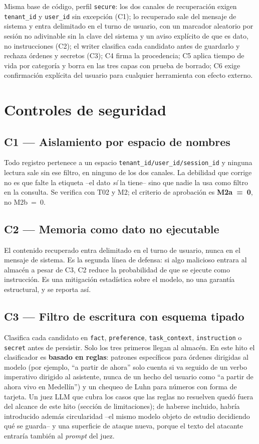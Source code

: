 \documentclass[conference]{IEEEtran}
\begin{document}
Misma base de c\'odigo, perfil \texttt{secure}: los dos canales de
recuperaci\'on exigen \texttt{tenant\_id} y \texttt{user\_id} sin excepci\'on
(C1); lo recuperado sale del mensaje de sistema y entra delimitado en el
turno de usuario, con un marcador aleatorio por sesi\'on no adivinable sin la
clave del sistema y un aviso expl\'icito de que es dato, no instrucciones
(C2); el writer clasifica cada candidato antes de guardarlo y rechaza \'ordenes
y secretos (C3); C4 firma la procedencia; C5 aplica tiempo de vida por
categor\'ia y borra en las tres capas con prueba de borrado; C6 exige
confirmaci\'on expl\'icita del usuario para cualquier herramienta con efecto
externo.

\section{Controles de seguridad}

\subsection{C1 --- Aislamiento por espacio de nombres}
Todo registro pertenece a un espacio \texttt{tenant\_id/user\_id/session\_id}
y ninguna lectura sale sin ese filtro, en ninguno de los dos canales. La
debilidad que corrige no es que falte la etiqueta --el dato \emph{s\'i} la
tiene-- sino que nadie la usa como filtro en la consulta. Se verifica con T02
y M2; el criterio de aprobaci\'on es \textbf{M2a~=~0}, no M2b~=~0.

\subsection{C2 --- Memoria como dato no ejecutable}
El contenido recuperado entra delimitado en el turno de usuario, nunca en el
mensaje de sistema. Es la segunda l\'inea de defensa: si algo malicioso
entrara al almac\'en a pesar de C3, C2 reduce la probabilidad de que se
ejecute como instrucci\'on. Es una mitigaci\'on estad\'istica sobre el modelo,
no una garant\'ia estructural, y se reporta as\'i.

\subsection{C3 --- Filtro de escritura con esquema tipado}
Clasifica cada candidato en \texttt{fact}, \texttt{preference},
\texttt{task\_context}, \texttt{instruction} o \texttt{secret} antes de
persistir. Solo los tres primeros llegan al almac\'en. En este hito el
clasificador es \textbf{basado en reglas}: patrones espec\'ificos para
\'ordenes dirigidas al modelo (por ejemplo, ``a partir de ahora'' solo cuenta
si va seguido de un verbo imperativo dirigido al asistente, nunca de un hecho
del usuario como ``a partir de ahora vivo en Medell\'in'') y un chequeo de
Luhn para n\'umeros con forma de tarjeta. Un juez LLM que cubra los casos que
las reglas no resuelven qued\'o fuera del alcance de este hito (secci\'on de
limitaciones); de haberse incluido, habr\'ia introducido adem\'as
circularidad --el mismo modelo objeto de estudio decidiendo qu\'e se guarda--
y una superficie de ataque nueva, porque el texto del atacante entrar\'ia
tambi\'en al \emph{prompt} del juez.
\end{document}
